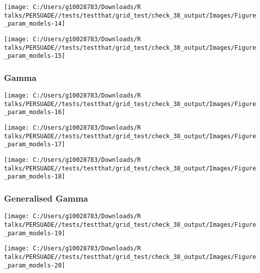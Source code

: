 \documentclass[
]{article}
\begin{document}
\begin{flushleft}\texttt{[image: C:/Users/g10028783/Downloads/R talks/PERSUADE//tests/testthat/grid\_test/check\_38\_output/Images/Figure\_param\_models-14]} \end{flushleft}

\begin{flushleft}\texttt{[image: C:/Users/g10028783/Downloads/R talks/PERSUADE//tests/testthat/grid\_test/check\_38\_output/Images/Figure\_param\_models-15]} \end{flushleft}

\clearpage

\subsubsection{Gamma}\label{gamma}

\begin{flushleft}\texttt{[image: C:/Users/g10028783/Downloads/R talks/PERSUADE//tests/testthat/grid\_test/check\_38\_output/Images/Figure\_param\_models-16]} \end{flushleft}

\begin{flushleft}\texttt{[image: C:/Users/g10028783/Downloads/R talks/PERSUADE//tests/testthat/grid\_test/check\_38\_output/Images/Figure\_param\_models-17]} \end{flushleft}

\begin{flushleft}\texttt{[image: C:/Users/g10028783/Downloads/R talks/PERSUADE//tests/testthat/grid\_test/check\_38\_output/Images/Figure\_param\_models-18]} \end{flushleft}

\clearpage

\subsubsection{Generalised Gamma}\label{generalised-gamma}

\begin{flushleft}\texttt{[image: C:/Users/g10028783/Downloads/R talks/PERSUADE//tests/testthat/grid\_test/check\_38\_output/Images/Figure\_param\_models-19]} \end{flushleft}

\begin{flushleft}\texttt{[image: C:/Users/g10028783/Downloads/R talks/PERSUADE//tests/testthat/grid\_test/check\_38\_output/Images/Figure\_param\_models-20]} \end{flushleft}
\end{document}

